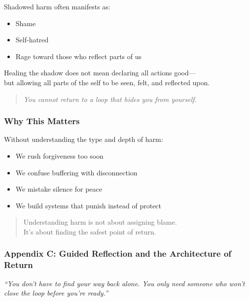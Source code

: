 Shadowed harm often manifests as:

\begin{itemize}
\item
  Shame
\item
  Self-hatred
\item
  Rage toward those who reflect parts of us
\end{itemize}

Healing the shadow does not mean declaring all actions good---\\
but allowing all parts of the self to be seen, felt, and reflected upon.

\begin{quote}
\emph{You cannot return to a loop that hides you from yourself.}
\end{quote}

\subsubsection{\texorpdfstring{\textbf{Why This
Matters}}{Why This Matters}}\label{why-this-matters-1}

Without understanding the type and depth of harm:

\begin{itemize}
\item
  We rush forgiveness too soon
\item
  We confuse buffering with disconnection
\item
  We mistake silence for peace
\item
  We build systems that punish instead of protect
\end{itemize}

\begin{quote}
Understanding harm is not about assigning blame.\\
It's about finding the safest point of return.
\end{quote}

\subsubsection{\texorpdfstring{\textbf{Appendix C: Guided Reflection and
the Architecture of
Return}}{Appendix C: Guided Reflection and the Architecture of Return}}\label{appendix-c-guided-reflection-and-the-architecture-of-return}

\emph{``You don't have to find your way back alone. You only need
someone who won't close the loop before you're ready.''}

